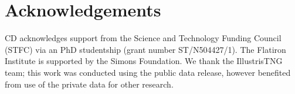 \documentclass[fleqn,usenatbib]{mnras}
\begin{document}

\section*{Acknowledgements}
CD acknowledges support from the Science and Technology Funding Council (STFC) via an PhD studentship (grant number ST/N504427/1). The Flatiron Institute is supported by the Simons Foundation. We thank the IllustrisTNG team; this work was conducted using the public data release, however benefited from use of the private data for other research. 

\vspace{-1em}

\label{lastpage}

 


\end{document}
